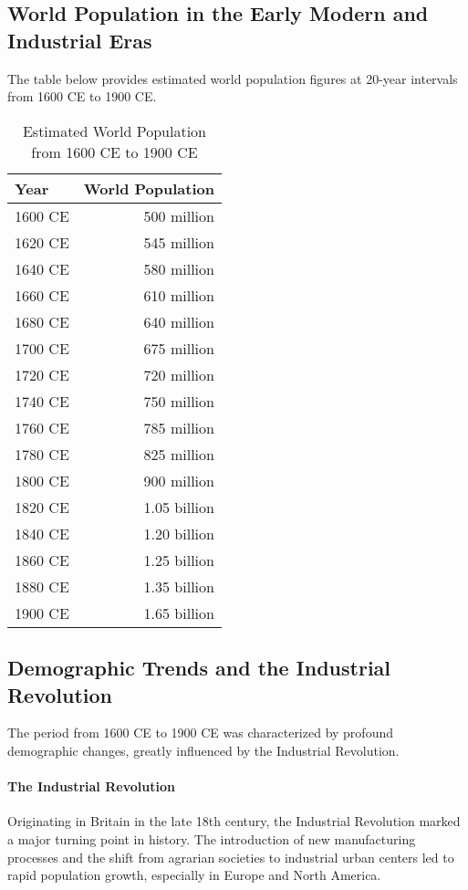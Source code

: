 \documentclass[a4paper,12pt]{book}
\begin{document}
\subsection*{World Population in the Early Modern and Industrial Eras}
The table below provides estimated world population figures at 20-year intervals from 1600 CE to 1900 CE.

\begin{table}[h!]
\centering
\begin{tabular}{|l|r|}
\hline
Year & World Population \\
\hline
1600 CE & 500 million \\
1620 CE & 545 million \\
1640 CE & 580 million \\
1660 CE & 610 million \\
1680 CE & 640 million \\
1700 CE & 675 million \\
1720 CE & 720 million \\
1740 CE & 750 million \\
1760 CE & 785 million \\
1780 CE & 825 million \\
1800 CE & 900 million \\
1820 CE & 1.05 billion \\
1840 CE & 1.20 billion \\
1860 CE & 1.25 billion \\
1880 CE & 1.35 billion \\
1900 CE & 1.65 billion \\
\hline
\end{tabular}
\caption{Estimated World Population from 1600 CE to 1900 CE}
\label{tab:world_population_1600_1900}
\end{table}

\subsection*{Demographic Trends and the Industrial Revolution}
The period from 1600 CE to 1900 CE was characterized by profound demographic changes, greatly influenced by the Industrial Revolution.

\paragraph{The Industrial Revolution}
Originating in Britain in the late 18th century, the Industrial Revolution marked a major turning point in history. The introduction of new manufacturing processes and the shift from agrarian societies to industrial urban centers led to rapid population growth, especially in Europe and North America.
\end{document}
